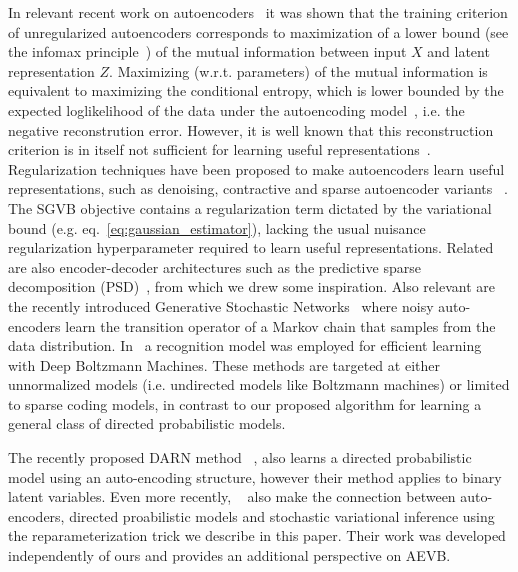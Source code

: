 \documentclass{article} %
\theoremstyle{definition}
\begin{document}
In relevant recent work on autoencoders~\cite{vincent2010stacked} it was shown that the training criterion of unregularized autoencoders corresponds to maximization of a lower bound (see the infomax principle~\cite{linsker1989application}) of the mutual information between input $X$ and latent representation $Z$. Maximizing (w.r.t. parameters) of the mutual information is equivalent to maximizing the conditional entropy, which is lower bounded by the expected loglikelihood of the data under the autoencoding model~\cite{vincent2010stacked}, i.e. the negative reconstrution error.
%
However, it is well known that this reconstruction criterion is in itself not sufficient for learning useful representations~\cite{bengio2013representation}.
%
Regularization techniques have been proposed to make autoencoders learn useful representations, such as  denoising, contractive and sparse autoencoder variants~ \cite{bengio2013representation}. The SGVB objective contains a regularization term dictated by the variational bound (e.g. eq.~\eqref{eq:gaussian_estimator}), lacking the usual nuisance regularization hyperparameter required to learn useful representations.
Related are also encoder-decoder architectures such as the predictive sparse decomposition (PSD)~\cite{koray-psd-08}, from which we drew some inspiration. Also relevant are the recently introduced Generative Stochastic Networks~\cite{bengio2013deep} where noisy auto-encoders learn the transition operator of a Markov chain that samples from the data distribution. In~\cite{salakhutdinov2010efficient} a recognition model was employed for efficient learning with Deep Boltzmann Machines.
These methods are targeted at either unnormalized models (i.e. undirected models like Boltzmann machines) or limited to sparse coding models, in contrast to our proposed algorithm for learning a general class of directed probabilistic models.

The recently proposed DARN method ~\cite{gregor2013deep}, also learns a directed probabilistic model using an auto-encoding structure, however their method applies to binary latent variables. 
Even more recently, ~\cite{rezende2014stochastic} also make the connection between auto-encoders, directed proabilistic models and stochastic variational inference using the reparameterization trick we describe in this paper. Their work was developed independently of ours and provides an additional perspective on AEVB.



%

%
%
%
%
\end{document}
